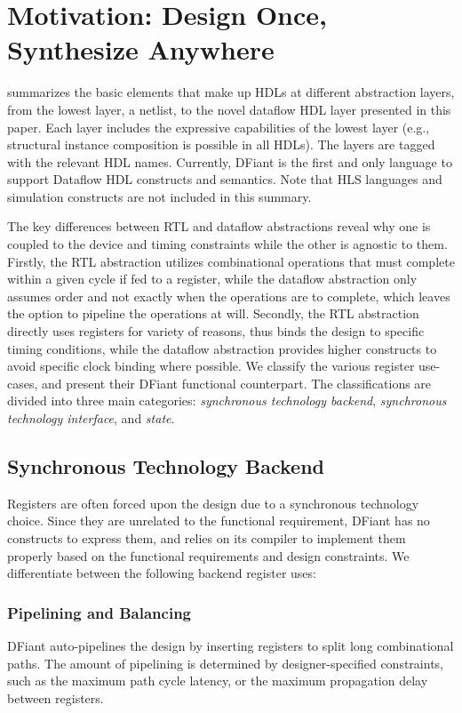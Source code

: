 \section{Motivation: Design Once, Synthesize Anywhere}
\label{sec:motivation}
 summarizes the basic elements that make up HDLs at different abstraction layers, from the lowest layer, a netlist, to the novel dataflow HDL layer presented in this paper. Each layer includes the expressive capabilities of the lowest layer (e.g., structural instance composition is possible in all HDLs). The layers are tagged with the relevant HDL names. Currently, DFiant is the first and only language to support Dataflow HDL constructs and semantics. Note that HLS languages and simulation constructs are not included in this summary.

The key differences between RTL and dataflow abstractions reveal why one is coupled to the device and timing constraints while the other is agnostic to them. Firstly, the RTL abstraction utilizes combinational operations that must complete within a given cycle if fed to a register, while the dataflow abstraction only assumes order and not exactly when the operations are to complete, which leaves the option to pipeline the operations at will. Secondly, the RTL abstraction directly uses registers for variety of reasons, thus binds the design to specific timing conditions, while the dataflow abstraction provides higher constructs to avoid specific clock binding where possible. We classify the various register use-cases, and present their DFiant functional counterpart. The classifications are divided into three main categories: \textit{synchronous technology backend}, \textit{synchronous technology interface}, and \textit{state}.

\subsection{Synchronous Technology Backend}
Registers are often forced upon the design due to a synchronous technology choice. Since they are unrelated to the functional requirement, DFiant has no constructs to express them, and relies on its compiler to implement them properly based on the functional requirements and design constraints.
We differentiate between the following backend register uses:
\subsubsection{Pipelining and Balancing}
DFiant auto-pipelines the design by inserting registers to split long combinational paths. The amount of pipelining is determined by designer-specified constraints, such as the maximum path cycle latency, or the maximum propagation delay between registers.
